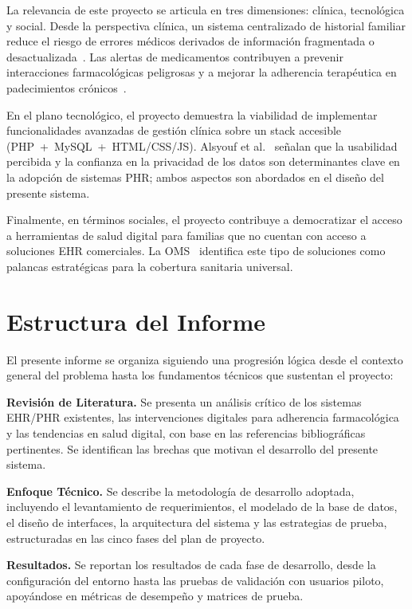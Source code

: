 \documentclass[12pt, letterpaper]{report}
\begin{document}
La relevancia de este proyecto se articula en tres dimensiones: clínica, tecnológica
y social. Desde la perspectiva clínica, un sistema centralizado de historial familiar
reduce el riesgo de errores médicos derivados de información fragmentada o
desactualizada~\cite{hayrinen2008definition}. Las alertas de medicamentos contribuyen
a prevenir interacciones farmacológicas peligrosas y a mejorar la adherencia
terapéutica en padecimientos crónicos~\cite{etminani2020behavior, arshed2024effectiveness}.

En el plano tecnológico, el proyecto demuestra la viabilidad de implementar
funcionalidades avanzadas de gestión clínica sobre un stack accesible
(PHP~+~MySQL~+~HTML/CSS/JS). Alsyouf et al.~\cite{alsyouf2023use} señalan que la
usabilidad percibida y la confianza en la privacidad de los datos son determinantes
clave en la adopción de sistemas PHR; ambos aspectos son abordados en el diseño del
presente sistema.

Finalmente, en términos sociales, el proyecto contribuye a democratizar el acceso a
herramientas de salud digital para familias que no cuentan con acceso a soluciones
EHR comerciales. La OMS~\cite{world2022consolidated} identifica este tipo de
soluciones como palancas estratégicas para la cobertura sanitaria universal.

\section{Estructura del Informe}

El presente informe se organiza siguiendo una progresión lógica desde el contexto
general del problema hasta los fundamentos técnicos que sustentan el proyecto:

\medskip
\noindent\textbf{Revisión de Literatura.} Se presenta un análisis crítico de los
sistemas EHR/PHR existentes, las intervenciones digitales para adherencia
farmacológica y las tendencias en salud digital, con base en las referencias
bibliográficas pertinentes. Se identifican las brechas que motivan el desarrollo
del presente sistema.

\medskip
\noindent\textbf{Enfoque Técnico.} Se describe la metodología de desarrollo adoptada,
incluyendo el levantamiento de requerimientos, el modelado de la base de datos, el
diseño de interfaces, la arquitectura del sistema y las estrategias de prueba,
estructuradas en las cinco fases del plan de proyecto.

\medskip
\noindent\textbf{Resultados.} Se reportan los resultados de cada fase de desarrollo,
desde la configuración del entorno hasta las pruebas de validación con usuarios
piloto, apoyándose en métricas de desempeño y matrices de prueba.
\end{document}
